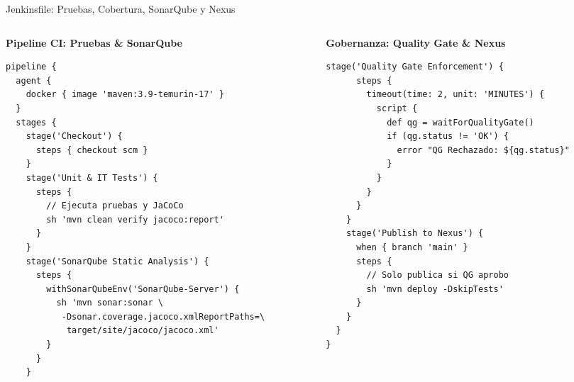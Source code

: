 \documentclass[aspectratio=169]{beamer}
\begin{document}
\begin{frame}[fragile]{Jenkinsfile: Pruebas, Cobertura, SonarQube y Nexus}
  \begin{columns}[T,onlytextwidth]
    \begin{column}{0.49\textwidth}
      {\scriptsize\bfseries\color{cbBlue} Pipeline CI: Pruebas \& SonarQube}\par
      \vspace{0.1cm}
      \begin{lstlisting}[style=groovylst,basicstyle=\ttfamily\fontsize{5.8pt}{6.9pt}\selectfont]
pipeline {
  agent { 
    docker { image 'maven:3.9-temurin-17' } 
  }
  stages {
    stage('Checkout') {
      steps { checkout scm }
    }
    stage('Unit & IT Tests') {
      steps {
        // Ejecuta pruebas y JaCoCo
        sh 'mvn clean verify jacoco:report'
      }
    }
    stage('SonarQube Static Analysis') {
      steps {
        withSonarQubeEnv('SonarQube-Server') {
          sh 'mvn sonar:sonar \
           -Dsonar.coverage.jacoco.xmlReportPaths=\
            target/site/jacoco/jacoco.xml'
        }
      }
    }
      \end{lstlisting}
    \end{column}
    \begin{column}{0.49\textwidth}
      {\scriptsize\bfseries\color{cbGreen} Gobernanza: Quality Gate \& Nexus}\par
      \vspace{0.1cm}
      \begin{lstlisting}[style=groovylst,basicstyle=\ttfamily\fontsize{5.8pt}{6.9pt}\selectfont]
    stage('Quality Gate Enforcement') {
      steps {
        timeout(time: 2, unit: 'MINUTES') {
          script {
            def qg = waitForQualityGate()
            if (qg.status != 'OK') {
              error "QG Rechazado: ${qg.status}"
            }
          }
        }
      }
    }
    stage('Publish to Nexus') {
      when { branch 'main' }
      steps {
        // Solo publica si QG aprobo
        sh 'mvn deploy -DskipTests'
      }
    }
  }
}
      \end{lstlisting}
    \end{column}
  \end{columns}
\end{frame}
\end{document}

